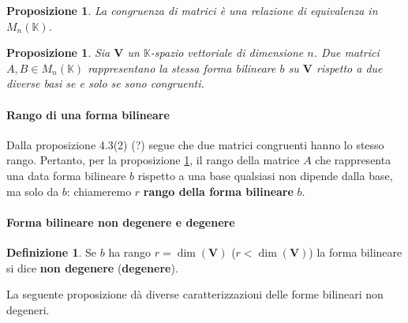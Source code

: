 \documentclass{article}
\theoremstyle{plain}
\newtheorem{prop}[thm]{Proposizione}
\theoremstyle{definition}
\newtheorem{defn}{Definizione}[section]
\theoremstyle{remark}
\begin{document}
\vspace{10pt}

\begin{bxthm}
\begin{prop}
La congruenza di matrici è una relazione di equivalenza in $M_n(\mathbb{K})$.    
\end{prop}
\end{bxthm}

\vspace{10pt}

\begin{bxthm}
\begin{prop}\label{quindicicinque}
Sia $\mathbf{V}$ un $\mathbb{K}$-spazio vettoriale di dimensione $n$. Due matrici $A, B \in M_n(\mathbb{K})$ 
rappresentano la stessa forma bilineare $b$ su $\mathbf{V}$ rispetto a due diverse basi se e solo se sono congruenti.    
\end{prop}
\end{bxthm}

\vspace{10pt}

\paragraph{Rango di una forma bilineare}
Dalla proposizione 4.3(2) (?) segue che due matrici congruenti hanno lo stesso rango. Pertanto, per la proposizione 
\ref{quindicicinque}, il rango della matrice $A$ che rappresenta una data forma bilineare $b$ rispetto a una 
base qualsiasi non dipende dalla base, ma solo da $b$: chiameremo $r$ \textbf{rango della forma bilineare} $b$.

\vspace{10pt}

\paragraph{Forma bilineare non degenere e degenere}
\begin{bxthm}
\begin{defn}
Se $b$ ha rango $r=\dim(\mathbf{V})$ ($r<\dim(\mathbf{V})$) la forma bilineare si dice \textbf{non degenere} (\textbf{degenere}).     
\end{defn}
\end{bxthm}

\vspace{10pt}

La seguente proposizione dà diverse caratterizzazioni delle forme bilineari non degeneri.
\end{document}
